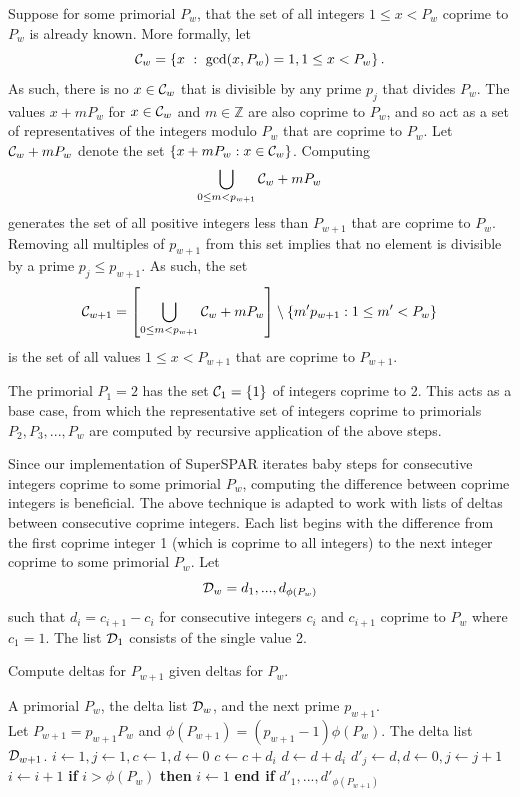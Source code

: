 \documentclass{ucalgthes1}
\theoremstyle{definition}
\newcommand{\ZZ}{\mathbb{Z}}
\begin{document}
Suppose for some primorial $P_w$, that the set of all integers $1 \le x < P_w$ coprime to $P_w$ is already known.  More formally, let
\[
	\mathcal C_w = \left\{x ~:~ \gcd(x, P_w) = 1, 1 \le x < P_w \right\}.
\]
As such, there is no $x \in \mathcal C_w$ that is divisible by any prime $p_j$ that divides $P_w$.  The values $x + mP_w$ for $x \in \mathcal C_w$ and $m \in \ZZ$ are also coprime to $P_w$, and so act as a set of representatives of the integers modulo $P_w$ that are coprime to $P_w$.  Let $\mathcal C_w + mP_w$ denote the set $\{x + mP_w : x \in \mathcal C_w\}$.  Computing
\[
	\bigcup_{0 \le m < p_{w+1}} \mathcal {\mathcal C}_w + mP_w
\]
generates the set of all positive integers less than $P_{w+1}$ that are coprime to $P_w$.  Removing all multiples of $p_{w+1}$ from this set implies that no element is divisible by a prime $p_j \le p_{w+1}$.  As such, the set
\[
	\mathcal C_{w+1} =
		\left[ \bigcup_{0 \le m < p_{w+1}} \mathcal C_w + mP_w \right]
	    \setminus \{ m' p_{w+1} : 1 \le m' < P_w \}
\]
is the set of all values $1 \le x < P_{w+1}$ that are coprime to $P_{w+1}$.

The primorial $P_1 = 2$ has the set $\mathcal C_1 = \{1\}$ of integers coprime to 2.  This acts as a base case, from which the representative set of integers coprime to primorials $P_2, P_3, ..., P_w$ are computed by recursive application of the above steps.

Since our implementation of SuperSPAR iterates baby steps for consecutive integers coprime to some primorial $P_w$, computing the difference between coprime integers is beneficial.  The above technique is adapted to work with lists of deltas between consecutive coprime integers.  Each list begins with the difference from the first coprime integer 1 (which is coprime to all integers) to the next integer coprime to some primorial $P_w$. Let
\[
	\mathcal D_w = d_1, ..., d_{\phi(P_w)}
\]
such that $d_i = c_{i+1} - c_i$ for consecutive integers $c_i$ and $c_{i+1}$ coprime to $P_w$ where $c_1 = 1$. The list $\mathcal D_1$ consists of the single value 2.

\begin{algorithm}[h]
\caption{Compute deltas for $P_{w+1}$ given deltas for $P_w$.}
\label{alg:deltaWheel}
\begin{algorithmic}[1]
\REQUIRE A primorial $P_w$, the delta list $\mathcal D_w$, and the next prime $p_{w+1}$. \\
Let $P_{w+1} = p_{w+1} P_w$ and $\phi(P_{w+1}) = (p_{w+1}-1)\phi(P_w)$.
\ENSURE The delta list $\mathcal D_{w+1}$.
\STATE $i \gets 1, j \gets 1, c \gets 1, d \gets 0$
	\STATE $c \gets c + d_i$ 
	\STATE $d \gets d + d_i$
		\STATE $d'_j \gets d, d \gets 0, j \gets j + 1$ 
	\ENDIF
	\STATE $i \gets i + 1$
	\STATE \textbf{if} $i > \phi(P_w)$ \textbf{then} $i \gets 1$ \textbf{end if}
\ENDWHILE
\RETURN $d'_1, ..., d'_{\phi(P_{w+1})}$
\end{algorithmic}
\end{algorithm}
\end{document}
